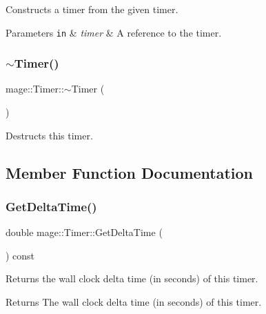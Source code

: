 Constructs a timer from the given timer.


\begin{DoxyParams}[1]{Parameters}
\mbox{\tt in}  & {\em timer} & A reference to the timer. \\
\hline
\end{DoxyParams}
\hypertarget{classmage_1_1_timer_a66d6964a6d42eef72f7312f1233e4f74}{}\label{classmage_1_1_timer_a66d6964a6d42eef72f7312f1233e4f74} 
\subsubsection{\texorpdfstring{$\sim$\+Timer()}{~Timer()}}
{\footnotesize\ttfamily mage\+::\+Timer\+::$\sim$\+Timer (\begin{DoxyParamCaption}{ }\end{DoxyParamCaption})\hspace{0.3cm}{\ttfamily [default]}}

Destructs this timer. 

\subsection{Member Function Documentation}
\hypertarget{classmage_1_1_timer_a83508bc11ab27be8186532352ddd0376}{}\label{classmage_1_1_timer_a83508bc11ab27be8186532352ddd0376} 
\subsubsection{\texorpdfstring{Get\+Delta\+Time()}{GetDeltaTime()}}
{\footnotesize\ttfamily double mage\+::\+Timer\+::\+Get\+Delta\+Time (\begin{DoxyParamCaption}{ }\end{DoxyParamCaption}) const}

Returns the wall clock delta time (in seconds) of this timer.

\begin{DoxyReturn}{Returns}
The wall clock delta time (in seconds) of this timer. 
\end{DoxyReturn}
\hypertarget{classmage_1_1_timer_a4e304e66d8466e2f6fa04d3d95c92d10}{}\label{classmage_1_1_timer_a4e304e66d8466e2f6fa04d3d95c92d10} 

